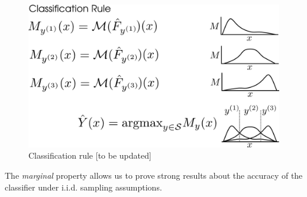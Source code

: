 \documentclass[12pt]{article}
\begin{document}
\begin{figure}[h]
\centering
\includegraphics[scale = 0.4]{classification_rule.png}
\caption{Classification rule [to be updated]}\label{fig:classification_rule}
\end{figure}

The \emph{marginal} property allows us to prove
strong results about the accuracy of the classifier under
i.i.d. sampling assumptions.
\end{document}
